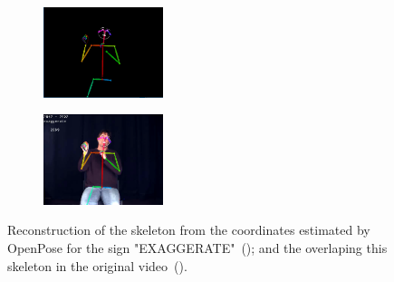 
\begin{figure}
    \centering
    \begin{subfigure}{3.5cm}
        \centering
        \includegraphics[width=3.5cm]{images/sign_pose}
        \caption{}
        \label{fig:sign-pose-skeleton}
    \end{subfigure}
    \begin{subfigure}{3.5cm}
      \centering
      \includegraphics[width=3.5cm]{images/sign_pose_blended}
      \caption{}
      \label{fig:sign-pose-blended}
    \end{subfigure}
    \caption{
        Reconstruction of the skeleton from the coordinates estimated by OpenPose for the sign "EXAGGERATE"~(); and the overlaping this skeleton in the original video~().
    }
    \label{fig:sign-pose}
\end{figure}


    
